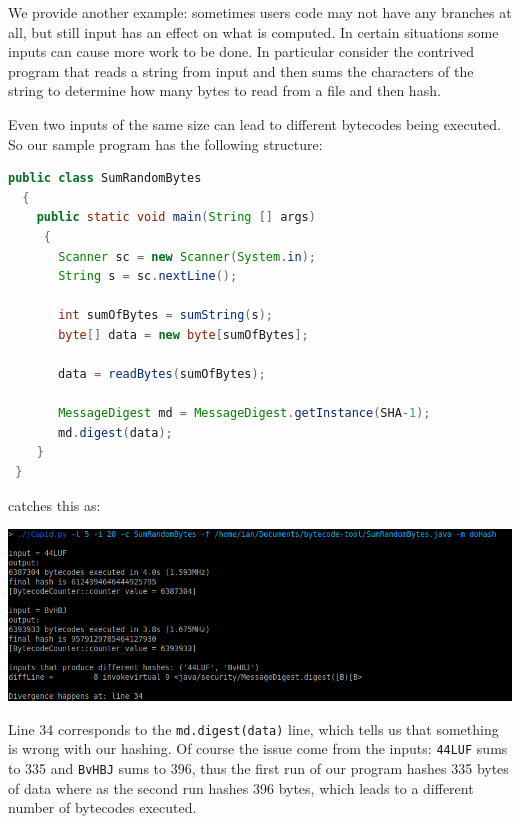 We provide another example: sometimes users code may not have any branches at all, but still input has an effect
on what is computed. In certain situations some inputs can cause more work to be done. In particular consider
the contrived program that reads a string from input and then sums the characters of the string to determine
how many bytes to read from a file and then hash.

Even two inputs of the same size can lead to different bytecodes being executed. So our sample program has
the following structure:

\begin{center}
  \begin{lstlisting}[language=Java]
  public class SumRandomBytes
  {
    public static void main(String [] args)
     {
       Scanner sc = new Scanner(System.in);
       String s = sc.nextLine();
      
       int sumOfBytes = sumString(s);
       byte[] data = new byte[sumOfBytes];
    
       data = readBytes(sumOfBytes);
 
       MessageDigest md = MessageDigest.getInstance(SHA-1);
       md.digest(data);
    }
 }
 \end{lstlisting}
\end{center}

\jcupid catches this as:

\begin{center}
  \includegraphics[width=\linewidth]{jCupidSumRandomBytes}
\end{center}

Line 34 corresponds to the \texttt{md.digest(data)} line, which tells us that something is wrong with our
hashing. Of course the issue come from the inputs: \texttt{44LUF} sums to 335 and \texttt{BvHBJ} sums to 
396, thus the first run of our program hashes 335 bytes of data where as the second run hashes 396 bytes,
which leads to a different number of bytecodes executed.
